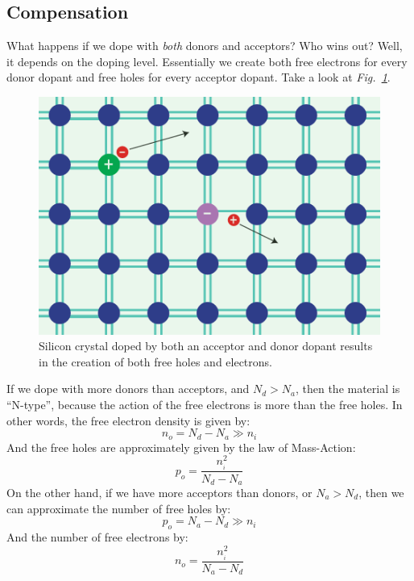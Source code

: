 \subsection{Compensation}
What happens if we dope with \textit{both} donors and acceptors?  Who wins out?  Well, it depends on the doping level.  Essentially we create both free electrons for every donor dopant and free holes for every acceptor dopant.  Take a look at \emph{Fig.~\ref{fig:silicon_dopant_both}}.
\begin{figure}[tb]
\centering
\includegraphics[width=.5\columnwidth]{silicon_dopant_both}
\caption{Silicon crystal doped by both an acceptor and donor dopant results in the creation of both free holes and electrons.}
\label{fig:silicon_dopant_both}
\end{figure}

If we dope with more donors than acceptors, and $N_d > N_a$, then the material is “N-type”, because the action of the free electrons is more than the free holes.  In other words, the free electron density is given by:
    \begin{equation}
        {n_o} = {N_d} - {N_a} \gg {n_i}
    \end{equation}
And the free holes are approximately given by the law of Mass-Action:
    \begin{equation}
        {p_o} = \frac{{n_{_i}^2}}{{{N_d} - {N_a}}}
    \end{equation}
On the other hand, if we have more acceptors than donors, or  $N_a > N_d$, then we can approximate the number of free holes by:
    \begin{equation}
        {p_o} = {N_a} - {N_d} \gg {n_i}
    \end{equation}
And the number of free electrons by:
    \begin{equation}
        {n_o} = \frac{{n_{_i}^2}}{{{N_a} - {N_d}}}
    \end{equation}
